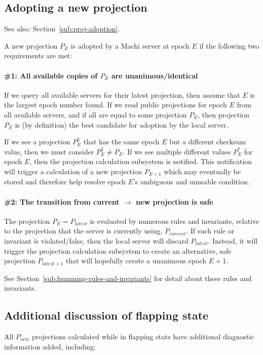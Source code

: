 \documentclass[preprint,10pt]{sigplanconf}
\begin{document}
\subsection{Adopting a new projection}
\label{sub:humming-proj-adoption}

See also: Section~\ref{sub:proj-adoption}.

A new projection $P_E$ is adopted by a Machi server at epoch $E$ if
the following two requirements are met:

\paragraph{\#1: All available copies of $P_E$ are unanimous/identical}

If we query all available servers for their latest projection, then assume
that $E$ is the largest epoch number found.  If we read public
projections for epoch $E$ from all available servers, and if all are
equal to some projection $P_E$, then projection $P_E$ is
(by definition) the best candidate for adoption by the local server.

If we see a projection $P^2_E$ that has the same epoch $E$ but a
different checksum value, then we must consider $P^2_E \ne P_E$.
If we see multiple different values $P^*_E$ for epoch $E$, then the
projection calculation subsystem is notified.  This notification
will trigger a calculation of a new projection $P_{E+1}$ which
may eventually be stored and therefore help
resolve epoch $E$'s ambiguous and unusable condition.

\paragraph{\#2: The transition from current $\rightarrow$ new projection is
safe}

The projection $P_E = P_{latest}$ is evaluated by numerous rules and
invariants, relative to the projection that the server is currently
using, $P_{current}$.  If such rule or invariant is violated/false,
then the local server will discard $P_{latest}$.  Instead, it will
trigger the projection calculation subsystem to create an alternative,
safe projection $P_{latest+1}$ that will hopefully create a unanimous
epoch $E+1$.

See Section~\ref{sub:humming-rules-and-invariants} for detail about
these rules and invariants.

\subsection{Additional discussion of flapping state}
\label{sub:flapping-state}
All $P_{new}$ projections
calculated while in flapping state have additional diagnostic
information added, including:
\end{document}
